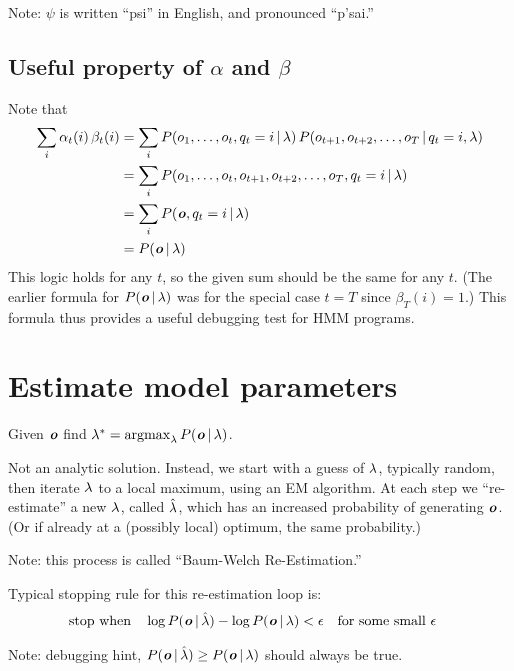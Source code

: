 Note: $\psi$ is written ``psi'' in English, and pronounced ``p'sai.''

\subsection{Useful property of $\alpha$ and $\beta$}

Note that
\begin{equation*}
  \begin{split}
    \sum_i \alpha_t(i) \, \beta_t(i) &=
    \sum_i P(o_1, \ldots,o_t,q_t=i \operatorname*{\vert} \lambda)
    \,
    P(o_{t+1}, o_{t+2}, \ldots, o_T \operatorname*{\vert} q_t = i, \lambda)
    \\
    &=
    \sum_i P(o_1, \ldots,o_t,o_{t+1}, o_{t+2}, \ldots, o_T,q_t=i \operatorname*{\vert} \lambda)
    \\
    &=
    \sum_i P(\boldsymbol{\mathit{o}}, q_t=i \operatorname*{\vert} \lambda)
    \\
    &= P(\boldsymbol{\mathit{o}} \operatorname*{\vert} \lambda)
  \end{split}
\end{equation*}
This logic holds for any $t$, so the given sum should be the same for
any $t$.  (The earlier formula for $P(\boldsymbol{\mathit{o}} \operatorname*{\vert} \lambda)$ was for
the special case $t=T$ since $\beta_T(i)=1$.)  This formula thus
provides a useful debugging test for HMM programs.

\section{Estimate model parameters}

Given $\boldsymbol{\mathit{o}}$ find $\lam^* = \argmax_{\lam} P(\vv{o} \given \lam)$.

Not an analytic solution.  Instead, we start with a guess of
$\lambda$, typically random, then iterate $\lambda$ to a local
maximum, using an EM algorithm.  At each step we ``re-estimate'' a new
$\lambda$, called $\hat{\lambda}$, which has an increased probability
of generating $\boldsymbol{\mathit{o}}$.  (Or if already at a (possibly local)
optimum, the same probability.)

Note: this process is called ``Baum-Welch Re-Estimation.''

Typical stopping rule for this re-estimation loop is:
\begin{align*}
  \text{stop when} \quad
  \log P(\boldsymbol{\mathit{o}} \operatorname*{\vert} \hat{\lambda})
  - \log P(\boldsymbol{\mathit{o}} \operatorname*{\vert} \lambda)
  &< \epsilon
  \quad \text{for some small $\epsilon$}
\end{align*}

Note: debugging hint, $P(\boldsymbol{\mathit{o}} \operatorname*{\vert} \hat{\lambda}) \geq P(\boldsymbol{\mathit{o}}
\operatorname*{\vert} \lambda)$ should always be true.

